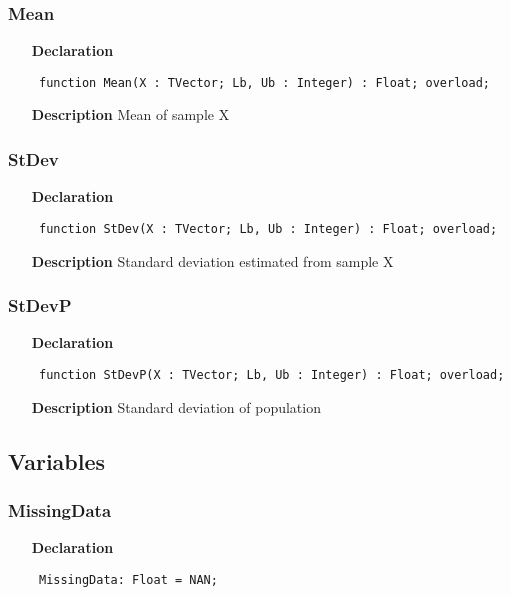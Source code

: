 \documentclass[12pt,a4paper,oneside]{report}
\newcommand{\declarationitem}[1]{\textbf{#1}}
\newcommand{\descriptiontitle}[1]{\textbf{#1}}
\newcommand{\code}[1]{\texttt{#1}}
\begin{document}
\subsubsection{Mean}
\label{umeansd_md-Mean}
\begin{itemize}\item[\declarationitem{Declaration}\hfill]
	\begin{flushleft}
		\code{
			function Mean(X : TVector; Lb, Ub : Integer) : Float; overload;}
	\end{flushleft}
	\item[\descriptiontitle{Description}]
	Mean of sample X
\end{itemize}
\subsubsection{StDev}
\label{umeansd_md-StDev}
\begin{itemize}\item[\declarationitem{Declaration}\hfill]
	\begin{flushleft}
		\code{
			function StDev(X : TVector; Lb, Ub : Integer) : Float; overload;}
	\end{flushleft}
	\item[\descriptiontitle{Description}]
	Standard deviation estimated from sample X
\end{itemize}
\subsubsection{StDevP}
\label{umeansd_md-StDevP}
\begin{itemize}\item[\declarationitem{Declaration}\hfill]
	\begin{flushleft}
		\code{
			function StDevP(X : TVector; Lb, Ub : Integer) : Float; overload;}
	\end{flushleft}
	\item[\descriptiontitle{Description}]
	Standard deviation of population
\end{itemize}
\subsection{Variables}
\subsubsection{MissingData}
\label{umeansd_md-MissingData}
\begin{itemize}\item[\declarationitem{Declaration}\hfill]
	\begin{flushleft}
		\code{
			MissingData: Float = NAN;}
	\end{flushleft}
\end{itemize}
\end{document}
